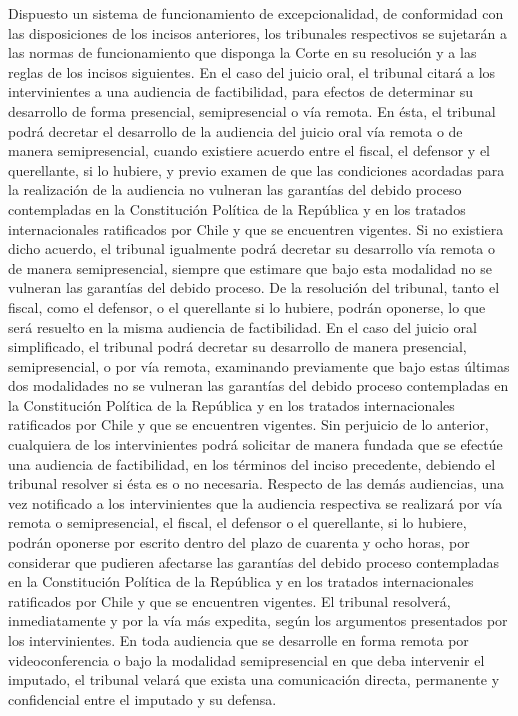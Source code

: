     Dispuesto un sistema de funcionamiento de excepcionalidad, de conformidad con las disposiciones de los incisos anteriores, los tribunales respectivos se sujetarán a las normas de funcionamiento que disponga la Corte en su resolución y a las reglas de los incisos siguientes.
    En el caso del juicio oral, el tribunal citará a los intervinientes a una audiencia de factibilidad, para efectos de determinar su desarrollo de forma presencial, semipresencial o vía remota. En ésta, el tribunal podrá decretar el desarrollo de la audiencia del juicio oral vía remota o de manera semipresencial, cuando existiere acuerdo entre el fiscal, el defensor y el querellante, si lo hubiere, y previo examen de que las condiciones acordadas para la realización de la audiencia no vulneran las garantías del debido proceso contempladas en la Constitución Política de la República y en los tratados internacionales ratificados por Chile y que se encuentren vigentes. Si no existiera dicho acuerdo, el tribunal igualmente podrá decretar su desarrollo vía remota o de manera semipresencial, siempre que estimare que bajo esta modalidad no se vulneran las garantías del debido proceso. De la resolución del tribunal, tanto el fiscal, como el defensor, o el querellante si lo hubiere, podrán oponerse, lo que será resuelto en la misma audiencia de factibilidad.
    En el caso del juicio oral simplificado, el tribunal podrá decretar su desarrollo de manera presencial, semipresencial, o por vía remota, examinando previamente que bajo estas últimas dos modalidades no se vulneran las garantías del debido proceso contempladas en la Constitución Política de la República y en los tratados internacionales ratificados por Chile y que se encuentren vigentes. Sin perjuicio de lo anterior, cualquiera de los intervinientes podrá solicitar de manera fundada que se efectúe una audiencia de factibilidad, en los términos del inciso precedente, debiendo el tribunal resolver si ésta es o no necesaria.
    Respecto de las demás audiencias, una vez notificado a los intervinientes que la audiencia respectiva se realizará por vía remota o semipresencial, el fiscal, el defensor o el querellante, si lo hubiere, podrán oponerse por escrito dentro del plazo de cuarenta y ocho horas, por considerar que pudieren afectarse las garantías del debido proceso contempladas en la Constitución Política de la República y en los tratados internacionales ratificados por Chile y que se encuentren vigentes. El tribunal resolverá, inmediatamente y por la vía más expedita, según los argumentos presentados por los intervinientes.
    En toda audiencia que se desarrolle en forma remota por videoconferencia o bajo la modalidad semipresencial en que deba intervenir el imputado, el tribunal velará que exista una comunicación directa, permanente y confidencial entre el imputado y su defensa.


